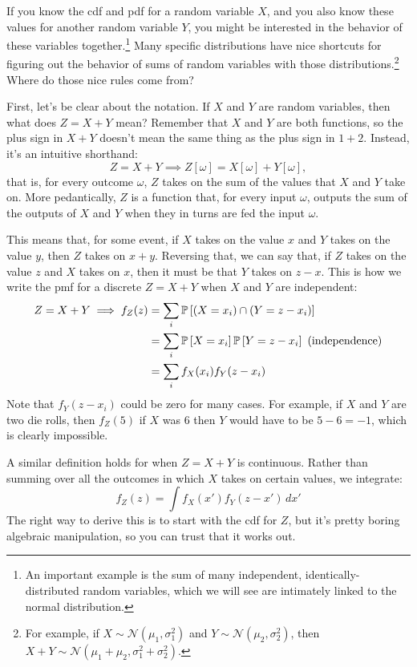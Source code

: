 If you know the cdf and pdf for a random variable $X$, and you also know these
values for another random variable $Y$, you might be interested in the
behavior of these variables together.\footnote{An important example is the sum
of many independent, identically-distributed random variables, which we will
see are intimately linked to the normal distribution.} Many specific
distributions have nice shortcuts for figuring out the behavior of sums of
random variables with those distributions.\footnote{For example, if $X \sim
\mathcal{N}(\mu_1, \sigma_1^2)$ and $Y \sim \mathcal{N}(\mu_2, \sigma_2^2)$,
then $X + Y \sim \mathcal{N}(\mu_1 + \mu_2, \sigma_1^2 + \sigma_2^2)$.} Where
do those nice rules come from?

First, let's be clear about the notation. If $X$ and $Y$ are random variables,
then what does $Z = X + Y$ mean? Remember that $X$ and $Y$ are both functions,
so the plus sign in $X + Y$ doesn't mean the same thing as the plus sign in $1
+ 2$. Instead, it's an intuitive shorthand:
\begin{equation}
Z = X + Y \implies Z[\omega] = X[\omega] + Y[\omega],
\end{equation}
that is, for every outcome $\omega$, $Z$ takes on the sum of the values that
$X$ and $Y$ take on. More pedantically, $Z$ is a function that, for every input
$\omega$, outputs the sum of the outputs of $X$ and $Y$ when they in turns are
fed the input $\omega$.

This means that, for some event, if $X$ takes on the value $x$ and $Y$ takes
on the value $y$, then $Z$ takes on $x+y$. Reversing that, we can say that, if
$Z$ takes on the value $z$ and $X$ takes on $x$, then it must be that $Y$
takes on $z - x$. This is how we write the pmf for a discrete $Z = X + Y$ when
$X$ and $Y$ are independent:
\begin{align*}
Z = X + Y \implies f_Z(z) &= \sum_i \mathbb{P}\left[{(X=x_i) \cap (Y=z - x_i)}\right] \\
  &= \sum_i \mathbb{P}\left[{X=x_i}\right] \mathbb{P}\left[{Y=z-x_i}\right] \text{ (independence)} \\
  &= \sum_i f_X(x_i) f_Y(z - x_i)
\end{align*}
Note that $f_Y(z-x_i)$ could be zero for many cases. For example, if $X$ and
$Y$ are two die rolls, then $f_Z(5)$ if $X$ was 6 then $Y$ would have to be $5
- 6 = -1$, which is clearly impossible.

A similar definition holds for when $Z = X + Y$ is continuous. Rather than
summing over all the outcomes in which $X$ takes on certain values, we integrate:
\begin{equation}
f_Z(z) = \int f_X(x') f_Y(z - x') \,dx'
\end{equation}
The right way to derive this is to start with the cdf for $Z$, but it's pretty
boring algebraic manipulation, so you can trust that it works out.

